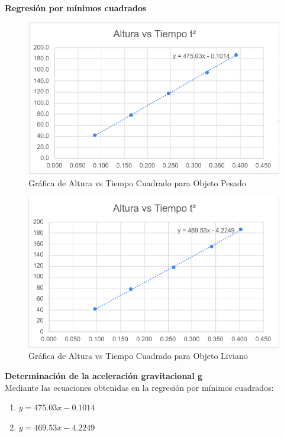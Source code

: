 \begin{multicols}{2}
\textbf{Regresión por mínimos cuadrados}
\begin{figure}[H]
    \centering
    \includegraphics[scale=0.5]{fig/objPesado-Altura-TiempoCuadrado.png}
    \caption{Gráfica de Altura vs Tiempo Cuadrado para Objeto Pesado}
\end{figure}

\begin{figure}[H]
    \centering
    \includegraphics[scale=0.5]{fig/objLiviano-Altura-TiempoCuadrado.png}
    \caption{Gráfica de Altura vs Tiempo Cuadrado para Objeto Liviano}
\end{figure}

\textbf{Determinación de la aceleración gravitacional g} \\
Mediante las ecuaciones obtenidas en la regresión por mínimos cuadrados:

\begin{enumerate}
    \item $y = 475.03x - 0.1014$
    \item $y = 469.53x - 4.2249$
\end{enumerate}



\end{multicols}
